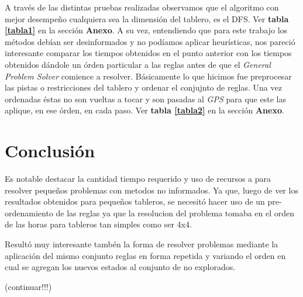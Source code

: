 \documentclass[%
	final,
	reprint,
	notitlepage,
	narroweqnarray,
	inline,
	twoside,
	invited
	]{ieee}
\begin{document}
\par A través de las distintas pruebas realizadas observamos que el algoritmo con mejor desempeño cualquiera sea la dimensión del tablero, es el DFS. Ver \textbf{tabla \ref{tabla1}} en la sección \textbf{Anexo}. A su vez, entendiendo que para este trabajo los métodos debían ser desinformados y no podíamos aplicar heurísticas, nos pareció interesante comparar los tiempos obtenidos en el punto anterior con los tiempos obtenidos dándole un órden particular a las reglas antes de que el \textit{General Problem Solver} comience a resolver. Básicamente lo que hicimos fue preprocesar las pistas o restricciones del tablero y ordenar el conjujnto de reglas. Una vez ordenadas éstas no son vueltas a tocar y son pasadas al \textit{GPS} para que este las aplique, en ese órden, en cada paso. Ver \textbf{tabla \ref{tabla2}} en la sección \textbf{Anexo}.

\section{Conclusión}

\PARstart Es notable destacar la cantidad tiempo requerido y uso de recursos a para resolver pequeños problemas con metodos no informados. Ya que, luego de ver los resultados obtenidos para pequeños tableros, se necesitó hacer uso de un pre-ordenamiento de las reglas ya que la resolucion del problema tomaba en el orden de las horas para tableros tan simples como ser 4x4.

Resultó muy interesante tambén la forma de resolver problemas mediante la aplicación del mismo conjunto reglas en forma repetida y variando el orden
en cual se agregan los nuevos estados al conjunto de no explorados. 

(continuar!!!)


%
%
%
%
%
\end{document}
